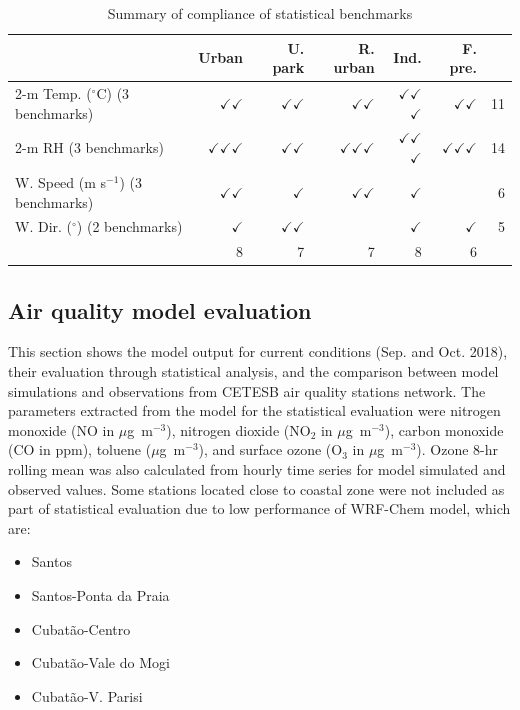 \begin{table}
\centering
\caption{Summary of compliance of statistical benchmarks }
\label{tab:sum_bench}
\begin{tabular}{lrrrrrr}
\toprule
{}        &    Urban &  U. park &  R. urban &    Ind. &  F. pre. & \\
\midrule
2-m Temp. ($^{\circ}$C)  (3 benchmarks)   &    $\checkmark$$\checkmark$ &  $\checkmark$$\checkmark$ &    $\checkmark$$\checkmark$ &  $\checkmark$$\checkmark$$\checkmark$ &    $\checkmark$$\checkmark$ & 11 \\
2-m RH (3 benchmarks)  &     $\checkmark$$\checkmark$$\checkmark$ &   $\checkmark$$\checkmark$ &     $\checkmark$$\checkmark$$\checkmark$ &   $\checkmark$$\checkmark$$\checkmark$ &     $\checkmark$$\checkmark$$\checkmark$ & 14\\
W. Speed (m s$^{-1}$) (3 benchmarks) &     $\checkmark$$\checkmark$ &   $\checkmark$ &     $\checkmark$$\checkmark$ &   $\checkmark$ &   & 6  \\
W. Dir. ($^{\circ}$) (2 benchmarks)  &     $\checkmark$ &   $\checkmark$$\checkmark$ &      &   $\checkmark$ &     $\checkmark$ & 5\\
\bottomrule
 & 8 & 7 & 7 & 8 & 6\\
\end{tabular}
\end{table}
	
  \subsection{Air quality model evaluation} \label{subsec:res_aq}
  This section shows the model output for current conditions (Sep. and Oct. 2018), their evaluation through statistical analysis, and the comparison between model simulations and observations from CETESB air quality stations network.
  The parameters extracted from the model for the statistical evaluation were nitrogen monoxide (NO in $\mu$g~m$^{-3}$), nitrogen dioxide (NO$_2$ in $\mu$g~m$^{-3}$), carbon monoxide (CO in ppm), toluene ($\mu$g~m$^{-3}$), and surface ozone (O$_3$ in $\mu$g~m$^{-3}$).
   Ozone 8-hr rolling mean was also calculated from hourly time series for model simulated and observed values.
   Some stations located close to coastal zone were not included as part of statistical evaluation due to low performance of WRF-Chem model, which are:
   
   \begin{itemize}
   	\item Santos
   	\item Santos-Ponta da Praia
   	\item Cubat\~{a}o-Centro
   	\item Cubat\~{a}o-Vale do Mogi
   	\item Cubat\~{a}o-V. Parisi
   \end{itemize}
   
